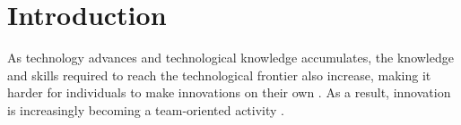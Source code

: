 \documentclass{article}
\begin{document}
{%















}

\section{Introduction}
\setcounter{page}{1}
As technology advances and technological knowledge accumulates, the knowledge and skills required to reach the technological frontier also increase, making it harder for individuals to make innovations on their own \autocite{Jones2009,Singh2010}. As a result, innovation is increasingly becoming a team-oriented activity \autocite{Wuchty2007,Agrawal2016}.
\end{document}
